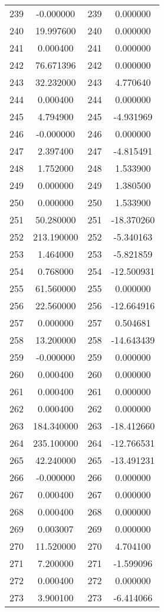 \documentclass[12pt]{article}
\begin{document}
\begin{longtable}{@{}cccc@{}}
239 & -0.000000 & 239 & 0.000000 \\
240 & 19.997600 & 240 & 0.000000 \\
241 & 0.000400 & 241 & 0.000000 \\
242 & 76.671396 & 242 & 0.000000 \\
243 & 32.232000 & 243 & 4.770640 \\
244 & 0.000400 & 244 & 0.000000 \\
245 & 4.794900 & 245 & -4.931969 \\
246 & -0.000000 & 246 & 0.000000 \\
247 & 2.397400 & 247 & -4.815491 \\
248 & 1.752000 & 248 & 1.533900 \\
249 & 0.000000 & 249 & 1.380500 \\
250 & 0.000000 & 250 & 1.533900 \\
251 & 50.280000 & 251 & -18.370260 \\
252 & 213.190000 & 252 & -5.340163 \\
253 & 1.464000 & 253 & -5.821859 \\
254 & 0.768000 & 254 & -12.500931 \\
255 & 61.560000 & 255 & 0.000000 \\
256 & 22.560000 & 256 & -12.664916 \\
257 & 0.000000 & 257 & 0.504681 \\
258 & 13.200000 & 258 & -14.643439 \\
259 & -0.000000 & 259 & 0.000000 \\
260 & 0.000400 & 260 & 0.000000 \\
261 & 0.000400 & 261 & 0.000000 \\
262 & 0.000400 & 262 & 0.000000 \\
263 & 184.340000 & 263 & -18.412660 \\
264 & 235.100000 & 264 & -12.766531 \\
265 & 42.240000 & 265 & -13.491231 \\
266 & -0.000000 & 266 & 0.000000 \\
267 & 0.000400 & 267 & 0.000000 \\
268 & 0.000400 & 268 & 0.000000 \\
269 & 0.003007 & 269 & 0.000000 \\
270 & 11.520000 & 270 & 4.704100 \\
271 & 7.200000 & 271 & -1.599096 \\
272 & 0.000400 & 272 & 0.000000 \\
273 & 3.900100 & 273 & -6.414066 \\

\end{longtable}
\end{document}
